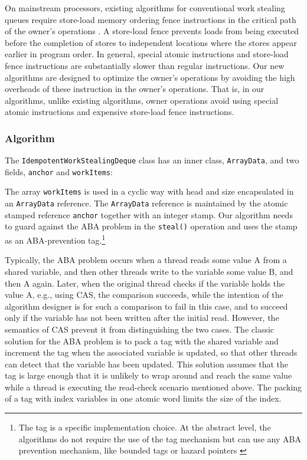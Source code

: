 On mainstream processors, existing algorithms for conventional work
stealing queues require store-load memory ordering fence instructions
in the critical path of the owner's operations \cite{Arora2001,
  Chase2005, Frigo1998, Hendler2006, Hendler2002}. A store-load fence
prevents loads from being executed before the completion of stores to
independent locations where the stores appear earlier in program
order. In general, special atomic instructions and store-load fence
instructions are substantially slower than regular instructions. Our
new algorithms are designed to optimize the owner's operations by
avoiding the high overheads of these instruction in the owner's
operations. That is, in our algorithms, unlike existing algorithms,
owner operations avoid using special atomic instructions and expensive
store-load fence instructions.

\subsubsection{Algorithm}

The \lstinline!IdempotentWorkStealingDeque! class has an inner class,
\lstinline!ArrayData!, and two fields, \lstinline!anchor! and
\lstinline!workItems!:



The array \lstinline!workItems! is used in a cyclic way with head and
size encapsulated in an \lstinline!ArrayData! reference. The
\lstinline!ArrayData! reference is maintained by the atomic stamped
reference \lstinline!anchor! together with an integer stamp. Our
algorithm needs to guard against the ABA problem in the
\lstinline!steal()! operation and uses the stamp as an ABA-prevention
tag.\footnote{The tag is a specific implementation choice. At the
  abstract level, the algorithms do not require the use of the tag
  mechanism but can use any ABA prevention mechanism, like bounded
  tags \cite{Moir1997} or hazard pointers \cite{Michael2004}}

Typically, the ABA problem occurs when a thread reads some value A
from a shared variable, and then other threads write to the variable
some value B, and then A again. Later, when the original thread checks
if the variable holds the value A, e.g., using CAS, the comparison
succeeds, while the intention of the algorithm designer is for such a
comparison to fail in this case, and to succeed only if the variable
has not been written after the initial read. However, the semantics of
CAS prevent it from distinguishing the two cases. The classic solution
for the ABA problem \cite{IBM1974} is to pack a tag with the shared
variable and increment the tag when the associated variable is
updated, so that other threads can detect that the variable has been
updated. This solution assumes that the tag is large enough that it is
unlikely to wrap around and reach the same value while a thread is
executing the read-check scenario mentioned above. The packing of a
tag with index variables in one atomic word limits the size of the
index.

